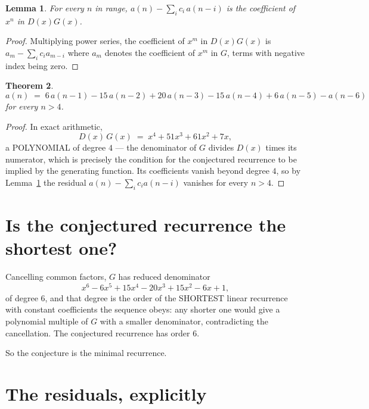 \documentclass[11pt,a4paper]{article}
\theoremstyle{plain}
\newtheorem{theorem}{Theorem}
\newtheorem{lemma}[theorem]{Lemma}
\theoremstyle{definition}
\begin{document}
\begin{lemma}\label{lem:key}
For every $n$ in range, $a(n)-\sum_i c_i\,a(n-i)$ is the coefficient of $x^{n}$ in
$D(x)G(x)$.
\end{lemma}

\begin{proof}
Multiplying power series, the coefficient of $x^{m}$ in $D(x)G(x)$ is
$a_m-\sum_i c_i a_{m-i}$ where $a_m$ denotes the coefficient of $x^{m}$ in $G$, terms with
negative index being zero.
\end{proof}

\begin{theorem}
\[
a(n)\;=\;6\,a(n-1) - 15\,a(n-2) + 20\,a(n-3) - 15\,a(n-4) + 6\,a(n-5) - a(n-6)
\]
for every $n>4$.
\end{theorem}

\begin{proof}
In exact arithmetic,
\[
D(x)\,G(x)\;=\;x^{4} + 51 x^{3} + 61 x^{2} + 7 x,
\]
a POLYNOMIAL of degree $4$ --- the denominator of $G$ divides $D(x)$ times its numerator,
which is precisely the condition for the conjectured recurrence to be implied by the
generating function. Its coefficients vanish beyond degree $4$, so by
Lemma~\ref{lem:key} the residual $a(n)-\sum_ic_ia(n-i)$ vanishes for every
$n>4$.
\end{proof}

\section{Is the conjectured recurrence the shortest one?}

Cancelling common factors, $G$ has reduced denominator
\[
x^{6} - 6 x^{5} + 15 x^{4} - 20 x^{3} + 15 x^{2} - 6 x + 1,
\]
of degree $6$, and that degree is the order of the SHORTEST linear recurrence with
constant coefficients the sequence obeys: any shorter one would give a polynomial multiple of
$G$ with a smaller denominator, contradicting the cancellation. The conjectured recurrence has
order $6$.

So the conjecture is the minimal recurrence.

\section{The residuals, explicitly}
\end{document}
